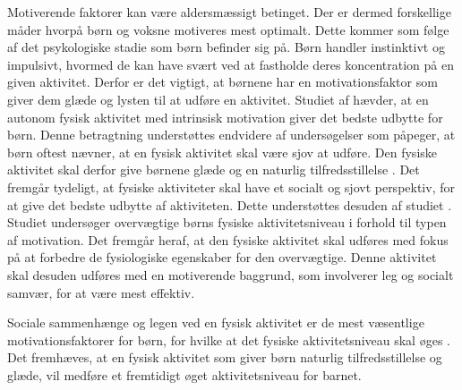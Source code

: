 Motiverende faktorer kan være aldersmæssigt betinget. Der er dermed forskellige måder hvorpå børn og voksne motiveres mest optimalt. Dette kommer som følge af det psykologiske stadie som børn befinder sig på. \newline
Børn handler instinktivt og impulsivt, hvormed de kan have svært ved at fastholde deres koncentration på en given aktivitet. Derfor er det vigtigt, at børnene har en motivationsfaktor som giver dem glæde og lysten til at udføre en aktivitet. \citep{V.Brown2007} \newline
Studiet af \cite{J.SebireJagoR.FoxEtAl2013} hævder, at en autonom fysisk aktivitet med intrinsisk motivation giver det bedste udbytte for børn. Denne betragtning understøttes endvidere af undersøgelser som påpeger, at børn oftest nævner, at en fysisk aktivitet skal være sjov at udføre. Den fysiske aktivitet skal derfor give børnene glæde og en naturlig tilfredsstillelse \citep{}. \newline
Det fremgår tydeligt, at fysiske aktiviteter skal have et socialt og sjovt perspektiv, for at give det bedste udbytte af aktiviteten. Dette understøttes desuden af studiet \cite{}. Studiet undersøger overvægtige børns fysiske aktivitetsniveau i forhold til typen af motivation. Det fremgår heraf, at den fysiske aktivitet skal udføres med fokus på at forbedre de fysiologiske egenskaber for den overvægtige. Denne aktivitet skal desuden udføres med en motiverende baggrund, som involverer leg og socialt samvær, for at være mest effektiv. \citep{} \newline

Sociale sammenhænge og legen ved en fysisk aktivitet er de mest væsentlige motivationsfaktorer for børn, for hvilke at det fysiske aktivitetsniveau skal øges \citep{}. Det fremhæves, at en fysisk aktivitet som giver børn naturlig tilfredsstillelse og glæde, vil medføre et fremtidigt øget aktivitetsniveau for barnet.
